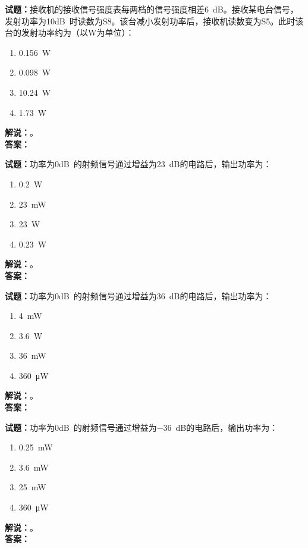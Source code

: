 \documentclass{ctexbook}
\begin{document}
\bigskip

\noindent\textbf{试题：}接收机的接收信号强度表每两档的信号强度相差\SI{6}{\dB}。接收某电台信号，发射功率为\num{10}\unit[qualifier-mode=combine]{\deci\bel{}}时读数为S8。该台减小发射功率后，接收机读数变为S5。此时该台的发射功率约为（以W为单位）：
\begin{enumerate}[leftmargin=3em]
  \item \SI{0.156}{\W}
  \item \SI{0.098}{\W}
  \item \SI{10.24}{\W}
  \item \SI{1.73}{\W}
\end{enumerate}
\noindent\textbf{解说：}\textbf{}。\\\noindent\textbf{答案：}

\bigskip

\noindent\textbf{试题：}功率为\num{0}\unit[qualifier-mode=combine]{\deci\bel{}}的射频信号通过增益为\SI{23}{\dB}的电路后，输出功率为：
\begin{enumerate}[leftmargin=3em]
  \item \SI{0.2}{\W}
  \item \SI{23}{\mW}
  \item \SI{23}{\W}
  \item \SI{0.23}{\W}
\end{enumerate}
\noindent\textbf{解说：}\textbf{}。\\\noindent\textbf{答案：}

\bigskip

\noindent\textbf{试题：}功率为\num{0}\unit[qualifier-mode=combine]{\deci\bel{}}的射频信号通过增益为\SI{36}{\dB}的电路后，输出功率为：
\begin{enumerate}[leftmargin=3em]
  \item \SI{4}{\mW}
  \item \SI{3.6}{\W}
  \item \SI{36}{\mW}
  \item \SI{360}{\uW}
\end{enumerate}
\noindent\textbf{解说：}\textbf{}。\\\noindent\textbf{答案：}

\bigskip

\noindent\textbf{试题：}功率为\num{0}\unit[qualifier-mode=combine]{\deci\bel{}}的射频信号通过增益为\SI{-36}{\dB}的电路后，输出功率为：
\begin{enumerate}[leftmargin=3em]
  \item \SI{0.25}{\mW}
  \item \SI{3.6}{\mW}
  \item \SI{25}{\mW}
  \item \SI{360}{\uW}
\end{enumerate}
\noindent\textbf{解说：}\textbf{}。\\\noindent\textbf{答案：}
\end{document}
